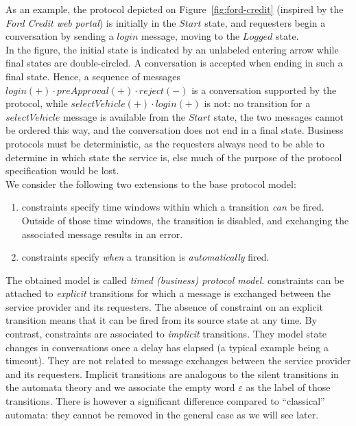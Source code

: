 As an example, the protocol depicted on Figure~\ref{fig:ford-credit} (inspired by the \emph{Ford Credit web portal}) is initially in the $Start$ state, and requesters begin a conversation by sending a $login$ message, moving to the $Logged$ state.\\

In the figure, the initial state is indicated by an unlabeled entering arrow while final states are double-circled. A conversation is accepted when ending in such a final state. Hence, a sequence of messages $login(+) \cdot preApproval(+) \cdot reject(-)$ is a conversation supported by the protocol, while $selectVehicle(+) \cdot login(+)$ is not: no transition for a $selectVehicle$ message is available from the $Start$ state, the two messages cannot be ordered this way, and the conversation does not end in a final state.  Business protocols must be deterministic, as the requesters always need to be able to determine in which state the service is, else much of the purpose of the protocol specification would be lost.\\

We consider the following two extensions to the base protocol model:
\begin{enumerate}

    \item \CInvoke constraints specify time windows within which a transition \emph{can} be fired. Outside of those time windows, the transition is disabled, and exchanging the associated message results in an error.
    
    \item \MInvoke constraints specify \emph{when} a transition is \emph{automatically} fired.
    
\end{enumerate}

The obtained model  is called  \emph{timed (business) protocol model}.
\CInvoke constraints can be attached to \emph{explicit} transitions for which a message is exchanged between the service provider and its requesters. The absence of \CInvoke constraint on an explicit transition means that it can be fired from its source state at any time.
By contrast, \MInvoke constraints are associated to \emph{implicit} transitions. They model state changes in conversations once a delay has elapsed (a typical example being a timeout). They are not related to message exchanges between the service provider and its requesters. Implicit transitions are analogous to the silent transitions in the automata theory \cite{Hopcroft79} and we associate the empty word $\varepsilon$ as the label of those transitions. There is however a significant difference compared to ``classical'' automata: they cannot be removed in the general case as we will see later. \\

